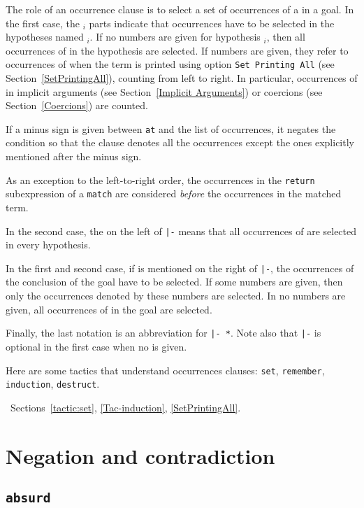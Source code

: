 The role of an occurrence clause is to select a set of occurrences of
a {\term} in a goal. In the first case, the {{\ident$_i$}
} parts
indicate that occurrences have to be selected in the hypotheses named
{\ident$_i$}.  If no numbers are given for hypothesis {\ident$_i$},
then all occurrences of {\term} in the hypothesis are selected. If
numbers are given, they refer to occurrences of {\term} when the term
is printed using option {\tt Set Printing All} (see
Section~\ref{SetPrintingAll}), counting from left to right. In
particular, occurrences of {\term} in implicit arguments (see
Section~\ref{Implicit Arguments}) or coercions (see
Section~\ref{Coercions}) are counted.

If a minus sign is given between {\tt at} and the list of occurrences,
it negates the condition so that the clause denotes all the occurrences except
the ones explicitly mentioned after the minus sign.

As an exception to the left-to-right order, the occurrences in the
{\tt return} subexpression of a {\tt match} are considered {\em
before} the occurrences in the matched term.

In the second case, the {\tt *} on the left of {\tt |-} means that
all occurrences of {\term} are selected in every hypothesis.

In the first and second case, if {\tt *} is mentioned on the right of
{\tt |-}, the occurrences of the conclusion of the goal have to be
selected. If some numbers are given, then only the occurrences denoted
by these numbers are selected. In no numbers are given, all
occurrences of {\term} in the goal are selected.

Finally, the last notation is an abbreviation for {\tt * |- *}. Note
also that {\tt |-} is optional in the first case when no {\tt *} is
given.

Here are some tactics that understand occurrences clauses:
{\tt set}, {\tt remember}, {\tt induction}, {\tt destruct}.

\SeeAlso~Sections~\ref{tactic:set}, \ref{Tac-induction}, \ref{SetPrintingAll}.


\section{Negation and contradiction}

\subsection{\tt absurd \term
{}
\label{absurd}}

